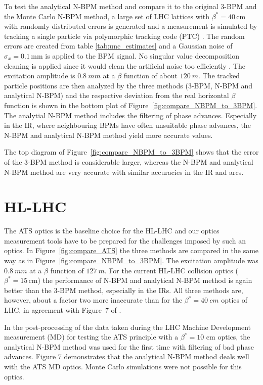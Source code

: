 To test the analytical N-BPM method and compare it to the original 3-BPM and the Monte Carlo N-BPM
method, a large set of LHC lattices with $ \beta^*=40\,\text{cm} $ with randomly distributed errors
is generated and a measurement is simulated by tracking a single particle via polymorphic tracking
code (PTC) \cite{Schmidt2002}. The random errors are created from table \ref{tab:unc_estimates}
and a Gaussian noise of $ \sigma_x = 0.1\,\text{mm} $ is applied to the BPM signal. No singular value
decomposition cleaning is applied since it would clean the artificial noise too efficiently
\cite{Langner2016}. The excitation amplitude is $\SI{0.8}{mm}$ at a $ \beta $ function of about
$ \SI{120}{m} $. The tracked particle positions are then analyzed by the three methods
(3-BPM, N-BPM and analytical N-BPM) and the respective deviation from the real horizontal
$ \beta $ function is shown in the bottom plot of Figure~\ref{fig:compare_NBPM_to_3BPM}.
The analytial N-BPM method includes the filtering of phase advances. Especially in the IR, where
neighbouring BPMs have often unsuitable phase advances, the N-BPM and analytical N-BPM method yield
more accurate values.

The top diagram of Figure~\ref{fig:compare_NBPM_to_3BPM} shows that the error of the 3-BPM method is considerable larger, whereas the N-BPM and analytical N-BPM method are very accurate with similar accuracies in the IR and arcs.


\section{HL-LHC}
The ATS optics \cite{Fartoukh2013} is the baseline choice for the HL-LHC and our optics measurement
tools have to be prepared for the challenges imposed by such an optics. In Figure~\ref{fig:compare_ATS}
the three methods are compared in the same way as in Figure~\ref{fig:compare_NBPM_to_3BPM}.
The excitation amplitude was $ \SI{0.8}{mm} $ at a $ \beta $ function of $ \SI{127}{m} $.
For the current HL-LHC collision optics ($ \beta^* =15\,\text{cm}$) the performance of N-BPM and
analytical N-BPM method is again better than the 3-BPM method, especially in the IRs. All three
methods are, however, about a factor two more inaccurate than for the $ \beta^*=\SI{40}{cm} $ optics
of LHC, in agreement with Figure~7 of \cite{LangnerNBPM}.

In the post-processing of the data taken during the LHC Machine Development
measurement (MD) \cite{mdpubl} for testing the ATS principle with a $ \beta^* = 10$ cm optics, the analytical N-BPM method was used for the first time with filtering of bad phase advances. Figure 7 demonstrates that the analytical N-BPM
method deals well with the ATS MD optics. Monte Carlo simulations were
not possible for this optics.

